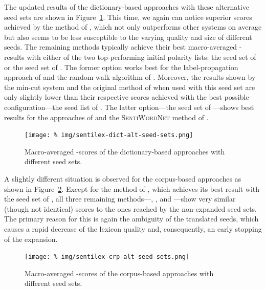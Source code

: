The updated results of the dictionary-based approaches with these
alternative seed sets are shown in
Figure~\ref{snt:fig:sent-dict-lex-alt-seeds}.  This time, we again can
notice superior scores achieved by the method of
\citet{Blair-Goldensohn:08}, which not only outperforms other systems
on average but also seems to be less susceptible to the varying
quality and size of different seeds.  The remaining methods typically
achieve their best macro-averaged \F{}-results with either of the two
top-performing initial polarity lists: the seed set of \citet{Kim:04}
or the seed set of \citet{Esuli:06c}.  The former option works best
for the label-propagation approach of \citet{Rao:09} and the random
walk algorithm of \citet{Awadallah:10}.  Moreover, the results shown
by the min-cut system \cite{Rao:09} and the original method of
\citet{Kim:04} when used with this seed set are only slightly lower
than their respective scores achieved with the best possible
configuration---the seed list of \citet{Turney:02}.  The latter
option---the seed set of \citet{Esuli:06c}---shows best results for
the approaches of \citet{Hu:04} and the \textsc{SentiWordNet} method
of \citet{Esuli:06c}.

\begin{figure}[hbtp!]
  \centering
  \texttt{[image: \%
    img/sentilex-dict-alt-seed-sets.png]}
  \caption{Macro-averaged \F{}-scores of the dictionary-based approaches
    with different seed sets.}\label{snt:fig:sent-dict-lex-alt-seeds}
\end{figure}

A slightly different situation is observed for the corpus-based
approaches as shown in Figure~\ref{snt:fig:sent-crp-lex-alt-seeds}.
Except for the method of \citet{Takamura:05}, which achieves its best
result with the seed set of \citet{Hu:04}, all three remaining
methods---\citet{Velikovich:10}, \citet{Kiritchenko:14}, and
\citet{Severyn:15}---show very similar (though not identical) scores
to the ones reached by the non-expanded seed sets.  The primary reason
for this is again the ambiguity of the translated seeds, which causes
a rapid decrease of the lexicon quality and, consequently, an early
stopping of the expansion.

\begin{figure}[hbtp!]
  \centering
  \texttt{[image: \%
    img/sentilex-crp-alt-seed-sets.png]}
  \caption{Macro-averaged \F{}-scores of the corpus-based approaches
  with different seed sets.}\label{snt:fig:sent-crp-lex-alt-seeds}
\end{figure}

